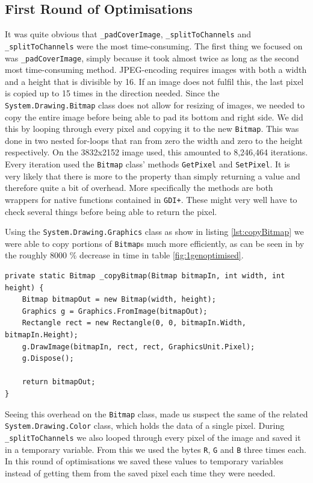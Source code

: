 \subsection{First Round of Optimisations}
It was quite obvious that \lstinline|_padCoverImage|, \lstinline|_splitToChannels| and \lstinline|_splitToChannels| were the most time-consuming.
The first thing we focused on was \lstinline|_padCoverImage|, simply because it took almost twice as long as the second most time-consuming method.
JPEG-encoding requires images with both a width and a height that is divisible by 16.
If an image does not fulfil this, the last pixel is copied up to 15 times in the direction needed.
Since the \lstinline|System.Drawing.Bitmap| class does not allow for resizing of images, we needed to copy the entire image before being able to pad its bottom and right side.
We did this by looping through every pixel and copying it to the new \lstinline|Bitmap|.
This was done in two nested for-loops that ran from zero the width and zero to the height respectively.
On the 3832x2152 image used, this amounted to 8,246,464 iterations.
Every iteration used the \lstinline|Bitmap| class' methods \lstinline|GetPixel| and \lstinline|SetPixel|.
It is very likely that there is more to the property than simply returning a value and therefore quite a bit of overhead.
More specifically the methods are both wrappers for native functions contained in \lstinline|GDI+|. 
These might very well have to check several things before being able to return the pixel.

Using the \lstinline|System.Drawing.Graphics| class as show in listing \ref{lst:copyBitmap} we were able to copy portions of \lstinline|Bitmap|s much more efficiently, \citep{MSDNBitmap} as can be seen in by the roughly 8000 \% decrease in time in table \ref{fig:1genoptimised}.


\begin{lstlisting}[firstnumber=684,label=lst:copyBitmap,caption={Copying a \lstinline|Bitmap| using the \lstinline|Graphics| class. From first round JPEGImage.cs.}]
private static Bitmap _copyBitmap(Bitmap bitmapIn, int width, int height) {
    Bitmap bitmapOut = new Bitmap(width, height);
    Graphics g = Graphics.FromImage(bitmapOut);
    Rectangle rect = new Rectangle(0, 0, bitmapIn.Width, bitmapIn.Height);
    g.DrawImage(bitmapIn, rect, rect, GraphicsUnit.Pixel);
    g.Dispose();

    return bitmapOut;
}
\end{lstlisting}

Seeing this overhead on the \lstinline|Bitmap| class, made us suspect the same of the related \lstinline|System.Drawing.Color| class, which holds the data of a single pixel.
During \lstinline|_splitToChannels| we also looped through every pixel of the image and saved it in a temporary variable. 
From this we used the bytes \lstinline|R|, \lstinline|G| and \lstinline|B| three times each. 
In this round of optimisations we saved these values to temporary variables instead of getting them from the saved pixel each time they were needed.

